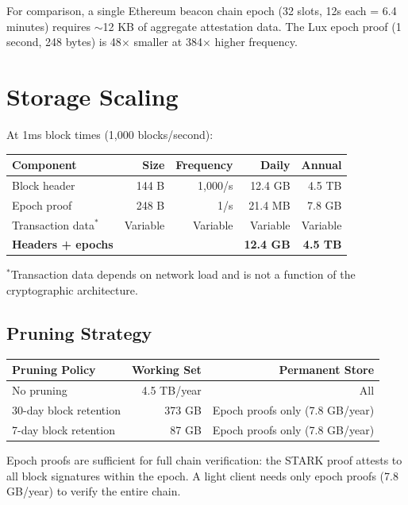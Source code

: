 \documentclass[11pt,a4paper]{article}
\begin{document}
For comparison, a single Ethereum beacon chain epoch (32 slots, 12s each = 6.4 minutes) requires $\sim$12 KB of aggregate attestation data. The Lux epoch proof (1 second, 248 bytes) is 48$\times$ smaller at 384$\times$ higher frequency.

\section{Storage Scaling}

At 1ms block times (1,000 blocks/second):

\begin{center}
\begin{tabular}{lrrrr}
\toprule
\textbf{Component} & \textbf{Size} & \textbf{Frequency} & \textbf{Daily} & \textbf{Annual} \\
\midrule
Block header & 144 B & 1,000/s & 12.4 GB & 4.5 TB \\
Epoch proof & 248 B & 1/s & 21.4 MB & 7.8 GB \\
Transaction data$^*$ & Variable & Variable & Variable & Variable \\
\midrule
\textbf{Headers + epochs} & & & \textbf{12.4 GB} & \textbf{4.5 TB} \\
\bottomrule
\end{tabular}
\end{center}

$^*$Transaction data depends on network load and is not a function of the cryptographic architecture.

\subsection{Pruning Strategy}

\begin{center}
\begin{tabular}{lrr}
\toprule
\textbf{Pruning Policy} & \textbf{Working Set} & \textbf{Permanent Store} \\
\midrule
No pruning & 4.5 TB/year & All \\
30-day block retention & 373 GB & Epoch proofs only (7.8 GB/year) \\
7-day block retention & 87 GB & Epoch proofs only (7.8 GB/year) \\
\bottomrule
\end{tabular}
\end{center}

Epoch proofs are sufficient for full chain verification: the STARK proof attests to all block signatures within the epoch. A light client needs only epoch proofs (7.8 GB/year) to verify the entire chain.
\end{document}
